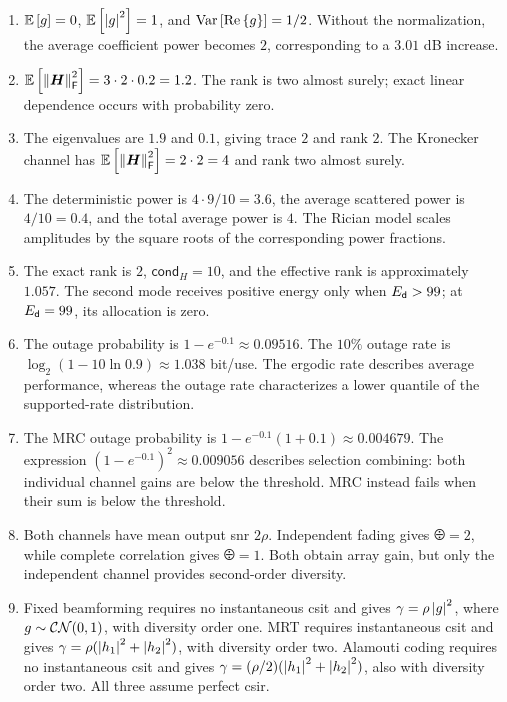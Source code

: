 \begin{enumerate}[label=\textbf{E\arabic*.}]
	
	\item $\mathbb{E}\left[g\right]=0$, $\mathbb{E}\left[\left|g\right|^2\right]=1$, and $\operatorname{Var}\left[\operatorname{Re}\left\{g\right\}\right]=1/2$. Without the normalization, the average coefficient power becomes $2$, corresponding to a $3.01$ dB increase.
	
	\item $\mathbb{E}\left[\left\|\bm{H}\right\|_{\mathsf{F}}^2\right]=3\cdot2\cdot0.2=1.2$. The rank is two almost surely; exact linear dependence occurs with probability zero.
	
	\item The eigenvalues are $1.9$ and $0.1$, giving trace $2$ and rank $2$. The Kronecker channel has $\mathbb{E}\left[\left\|\bm{H}\right\|_{\mathsf{F}}^2\right]=2\cdot2=4$ and rank two almost surely.
	
	\item The deterministic power is $4\cdot9/10=3.6$, the average scattered power is $4/10=0.4$, and the total average power is $4$. The Rician model scales amplitudes by the square roots of the corresponding power fractions.
	
	\item The exact rank is $2$, $\mathsf{cond}_{H}=10$, and the effective rank is approximately $1.057$. The second mode receives positive energy only when $E_{\mathsf{d}}>99$; at $E_{\mathsf{d}}=99$, its allocation is zero.
	
	\item The outage probability is $1-e^{-0.1}\approx0.09516$. The $10\%$ outage rate is $\log_2(1-10\ln0.9)\approx1.038$ bit/use. The ergodic rate describes average performance, whereas the outage rate characterizes a lower quantile of the supported-rate distribution.
	
	\item The MRC outage probability is $1-e^{-0.1}(1+0.1)\approx0.004679$. The expression $(1-e^{-0.1})^2\approx0.009056$ describes selection combining: both individual channel gains are below the threshold. MRC instead fails when their sum is below the threshold.
	
	\item Both channels have mean output \ac{snr} $2\rho$. Independent fading gives $\odiv=2$, while complete correlation gives $\odiv=1$. Both obtain array gain, but only the independent channel provides second-order diversity.
	
	\item Fixed beamforming requires no instantaneous \ac{csit} and gives $\gamma=\rho\left|g\right|^2$, where $g\sim\mathcal{CN}(0,1)$, with diversity order one. MRT requires instantaneous \ac{csit} and gives $\gamma=\rho(\left|h_1\right|^2+\left|h_2\right|^2)$, with diversity order two. Alamouti coding requires no instantaneous \ac{csit} and gives $\gamma=(\rho/2)(\left|h_1\right|^2+\left|h_2\right|^2)$, also with diversity order two. All three assume perfect \ac{csir}.
	

\end{enumerate}
